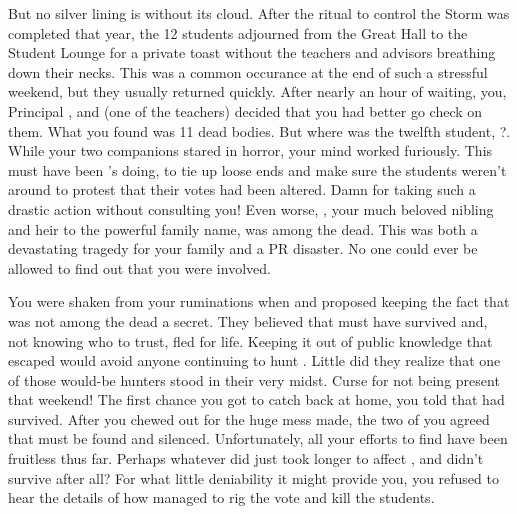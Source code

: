 \documentclass[char]{GL2020}
\begin{document}
But no silver lining is without its cloud. After the ritual to control the Storm was completed that year, the 12 students adjourned from the Great Hall to the Student Lounge for a private toast without the teachers and advisors breathing down their necks. This was a common occurance at the end of such a stressful weekend, but they usually returned quickly. After nearly an hour of waiting, you, Principal \cPrincipal{\full}, and \cMusic{\full} (one of the teachers) decided that you had better go check on them. What you found was 11 dead bodies. But where was the twelfth student, \cKidScientist{\full}?. While your two companions stared in horror, your mind worked furiously. This must have been \cEvil{}'s doing, to tie up loose ends and make sure the students weren't around to protest that their votes had been altered. Damn \cEvil{\them} for taking such a drastic action without consulting you! Even worse, \cHeirSibling{\full}, your much beloved nibling and heir to the powerful family name, was among the dead. This was both a devastating tragedy for your family and a PR disaster. No one could ever be allowed to find out that you were involved. 

You were shaken from your ruminations when \cPrincipal{} and \cMusic{} proposed keeping the fact that \cKidScientist{} was not among the dead a secret. They believed that \cKidScientist{} must have survived and, not knowing who to trust, fled for \cKidScientist{\their} life. Keeping it out of public knowledge that \cKidScientist{\they} escaped would avoid anyone continuing to hunt \cKidScientist{\them}. Little did they realize that one of those would-be hunters stood in their very midst. Curse \cEvil{} for not being present that weekend! The first chance you got to catch \cEvil{} back at home, you told \cEvil{\them} that \cKidScientist{} had survived. After you chewed \cEvil{\them} out for the huge mess \cEvil{\they} made, the two of you agreed that \cKidScientist{\they} must be found and silenced. Unfortunately, all your efforts to find \cKidScientist{\them} have been fruitless thus far. Perhaps whatever \cEvil{} did just took longer to affect \cKidScientist{}, and \cKidScientist{\they} didn't survive after all? For what little deniability it might provide you, you refused to hear the details of how \cEvil{} managed to rig the vote and kill the students.
\end{document}
